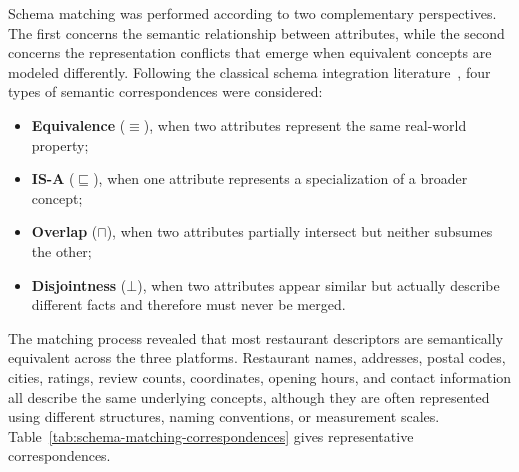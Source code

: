 Schema matching was performed according to two complementary perspectives. The first concerns the semantic relationship between attributes, while the second concerns the representation conflicts that emerge when equivalent concepts are modeled differently. Following the classical schema integration literature~\cite{rahm-bernstein-2001}, four types of semantic correspondences were considered:


\begin{itemize}
\item \textbf{Equivalence} ($\equiv$), when two attributes represent the same real-world property;
\item \textbf{IS-A} ($\sqsubseteq$), when one attribute represents a specialization of a broader concept;
\item \textbf{Overlap} ($\sqcap$), when two attributes partially intersect but neither subsumes the other;
\item \textbf{Disjointness} ($\bot$), when two attributes appear similar but actually describe different facts and therefore must never be merged.
\end{itemize}

The matching process revealed that most restaurant descriptors are semantically equivalent across the three platforms. Restaurant names, addresses, postal codes, cities, ratings, review counts, coordinates, opening hours, and contact information all describe the same underlying concepts, although they are often represented using different structures, naming conventions, or measurement scales. Table~\ref{tab:schema-matching-correspondences} gives representative correspondences.

